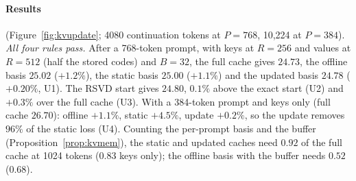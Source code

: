 \documentclass[10pt]{article}
\theoremstyle{plain}
\theoremstyle{definition}
\theoremstyle{remark}
\newcommand{\rl}[1]{\textsf{#1}}%
\begin{document}
\paragraph{Results} (Figure~\ref{fig:kvupdate}; 4080 continuation tokens at $P=768$, 10{,}224 at $P=384$).
\emph{All four rules pass.} After a 768-token prompt, with keys at $R=256$ and values at $R=512$ (half the stored codes) and $B=32$, the full cache gives $24.73$, the offline basis $25.02$ ($+1.2\%$), the static basis $25.00$ ($+1.1\%$) and the updated basis $24.78$ ($+0.20\%$, \rl{U1}). The RSVD start gives $24.80$, $0.1\%$ above the exact start (\rl{U2}) and $+0.3\%$ over the full cache (\rl{U3}). With a 384-token prompt and keys only (full cache $26.70$): offline $+1.1\%$, static $+4.5\%$, update $+0.2\%$, so the update removes $96\%$ of the static loss (\rl{U4}). Counting the per-prompt basis and the buffer (Proposition~\ref{prop:kvmem}), the static and updated caches need $0.92$ of the full cache at 1024 tokens ($0.83$ keys only); the offline basis with the buffer needs $0.52$ ($0.68$).
\end{document}
